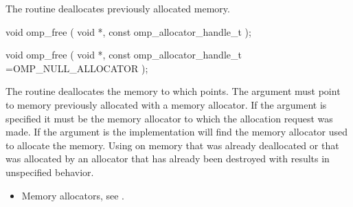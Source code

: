\begin{ccppspecific}
\summary
The  routine deallocates previously allocated memory.

\format

\begin{cspecific}
\begin{ompcFunction}
void omp_free ( void *, const omp_allocator_handle_t );
\end{ompcFunction}
\end{cspecific}
\begin{cppspecific}
\begin{ompcFunction}
void omp_free (
  void *,
  const omp_allocator_handle_t =OMP_NULL_ALLOCATOR
);
\end{ompcFunction}
\end{cppspecific}

\effect

The  routine deallocates the memory to which  points. The  argument must point to memory previously allocated with a memory allocator. If the  argument is specified it must be the memory allocator to which the allocation request was made. If the  argument is  the implementation will find the memory allocator used to allocate the memory. Using  on memory that was already deallocated or that was allocated by an allocator that has already been destroyed with  results in unspecified behavior.

\crossreferences
\begin{itemize}
\item Memory allocators, see .
\end{itemize}

\end{ccppspecific}
